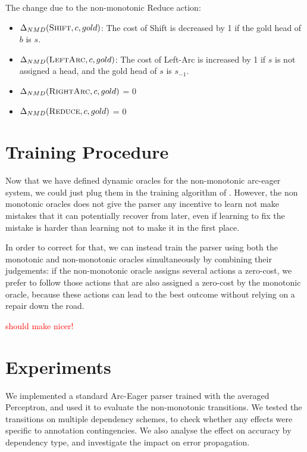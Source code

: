 \documentclass[11pt,letterpaper]{article}
\newcommand{\note}[1]{\textcolor{red}{#1}}
\begin{document}
The change due to the non-monotonic Reduce action:
\begin{itemize}

   \item $\Delta_{NMD}(\textsc{Shift},c,gold)$: The cost of Shift is decreased by 1 if the gold head of $b$ is $s$.

   \item $\Delta_{NMD}(\textsc{LeftArc},c,gold)$: The cost of Left-Arc is increased by 1 if $s$ is not assigned a head, and the gold head of $s$ is $s_{-1}$.

   \item $\Delta_{NMD}(\textsc{RightArc},c,gold)$ = 0

   \item $\Delta_{NMD}(\textsc{Reduce},c,gold)$ = 0

\end{itemize}

\section{Training Procedure}

Now that we have defined dynamic oracles for the non-monotonic arc-eager
system, we could just plug them in the training algorithm of
\cite{coling2012}.  However, the non monotonic oracles does not give the
parser any incentive to learn not make mistakes that it can potentially recover from
later, even if learning to fix the mistake is harder than learning not to make
it in the first place.

In order to correct for that, we can instead train the parser using both the
monotonic and non-monotonic oracles simultaneously by combining their
judgements: if the non-monotonic oracle assigns several actions a zero-cost,
we prefer to follow those actions that are also assigned a zero-cost by the
monotonic oracle, because these actions can lead to the best outcome without
relying on a repair down the road.

\note{should make nicer!}


\section{Experiments}

We implemented a standard Arc-Eager parser trained with the averaged Perceptron,
and used it to evaluate the non-monotonic transitions. We tested the transitions on
multiple dependency schemes, to check whether any effects were specific to annotation
contingencies. We also analyse the effect on accuracy by dependency type, and
investigate the impact on error propagation.
\end{document}
